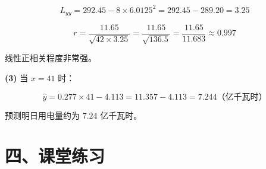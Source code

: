 \documentclass[12pt, a4paper]{ctexart}
\begin{document}
\[
L_{yy} = 292.45 - 8 \times 6.0125^2 = 292.45 - 289.20 = 3.25
\]

\[
r = \frac{11.65}{\sqrt{42 \times 3.25}} = \frac{11.65}{\sqrt{136.5}} = \frac{11.65}{11.683} \approx 0.997
\]

线性正相关程度非常强。

\medskip
\textbf{(3)} 当 $x = 41$ 时：

\[
\hat{y} = 0.277 \times 41 - 4.113 = 11.357 - 4.113 = 7.244 \text{（亿千瓦时）}
\]

预测明日用电量约为 $\boxed{7.24}$ 亿千瓦时。

\newpage

\section*{\textcolor{tipgreen}{四、课堂练习}}
\end{document}
